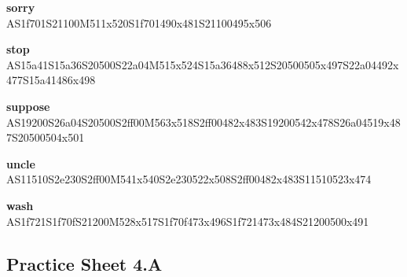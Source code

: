 \documentclass{article}
\begin{document}
\begin{glossary}
\textbf{sorry}\\
AS1f701S21100M511x520S1f701490x481S21100495x506

\textbf{stop}\\
AS15a41S15a36S20500S22a04M515x524S15a36488x512S20500505x497S22a04492x477S15a41486x498

\textbf{suppose}\\
AS19200S26a04S20500S2ff00M563x518S2ff00482x483S19200542x478S26a04519x487S20500504x501

\textbf{uncle}\\
AS11510S2e230S2ff00M541x540S2e230522x508S2ff00482x483S11510523x474

\textbf{wash}\\
AS1f721S1f70fS21200M528x517S1f70f473x496S1f721473x484S21200500x491

\end{glossary}

\subsection{Practice Sheet 4.A}
\end{document}
